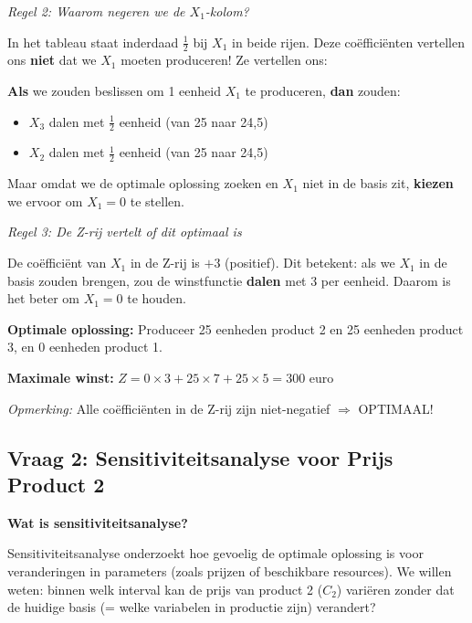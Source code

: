 \documentclass[a4paper,11pt]{article}
\begin{document}
\begin{oefenblok}
    \textit{Regel 2: Waarom negeren we de $X_1$-kolom?}

    In het tableau staat inderdaad $\frac{1}{2}$ bij $X_1$ in beide rijen. Deze coëfficiënten vertellen ons \textbf{niet} dat we $X_1$ moeten produceren! Ze vertellen ons:

    \begin{warningbox}
        \textbf{Als} we zouden beslissen om 1 eenheid $X_1$ te produceren, \textbf{dan} zouden:
        \begin{itemize}
            \item $X_3$ dalen met $\frac{1}{2}$ eenheid (van 25 naar 24,5)
            \item $X_2$ dalen met $\frac{1}{2}$ eenheid (van 25 naar 24,5)
        \end{itemize}
    \end{warningbox}

    Maar omdat we de optimale oplossing zoeken en $X_1$ niet in de basis zit, \textbf{kiezen}
    we ervoor om $X_1 = 0$ te stellen.

    \textit{Regel 3: De Z-rij vertelt of dit optimaal is}

    De coëfficiënt van $X_1$ in de Z-rij is $+3$ (positief).
    Dit betekent: als we $X_1$ in de basis zouden brengen, zou de winstfunctie \textbf{dalen}
    met 3 per eenheid. Daarom is het beter om $X_1 = 0$ te houden.

    \vspace{0.3cm}

    \textbf{Optimale oplossing:} Produceer 25 eenheden product 2 en 25 eenheden product 3, en 0 eenheden product 1.

    \textbf{Maximale winst:} $Z = 0 \times 3 + 25 \times 7 + 25 \times 5 = 300$ euro

    \textit{Opmerking:} Alle coëfficiënten in de Z-rij zijn niet-negatief $\Rightarrow$ OPTIMAAL!

    \subsection*{Vraag 2: Sensitiviteitsanalyse voor Prijs Product 2}

    \textbf{Wat is sensitiviteitsanalyse?}

    Sensitiviteitsanalyse onderzoekt hoe gevoelig de optimale oplossing is voor veranderingen in parameters (zoals prijzen of beschikbare resources). We willen weten: binnen welk interval kan de prijs van product 2 ($C_2$) variëren zonder dat de huidige basis (= welke variabelen in productie zijn) verandert?


\end{oefenblok}
\end{document}
